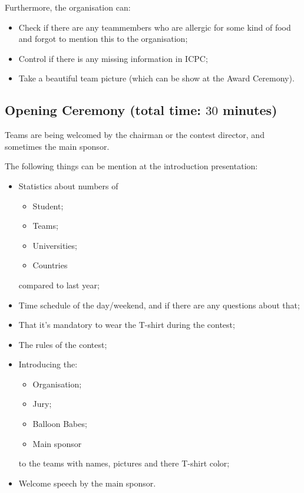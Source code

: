 Furthermore, the organisation can:
\begin{itemize}
\item Check if there are any teammembers who are allergic for some kind of food and forgot to mention this to the organisation;
\item Control if there is any missing information in ICPC;
\item Take a beautiful team picture (which can be show at the Award Ceremony).
\end{itemize}

\subsection{Opening Ceremony (total time: $30$ minutes)}\label{openingCeremony}
Teams are being welcomed by the chairman or the contest director, and sometimes the main sponsor.

The following things can be mention at the introduction presentation:
\begin{itemize}
\item Statistics about numbers of
	\begin{itemize}
	\item Student;
	\item Teams;
	\item Universities;
	\item Countries
	\end{itemize}
compared to last year;
\item Time schedule of the day/weekend, and if there are any questions about that;
\item That it's mandatory to wear the T-shirt during the contest;
\item The rules of the contest;
\item Introducing the:
	\begin{itemize}
	\item Organisation;
	\item Jury;
	\item Balloon Babes;
	\item Main sponsor
	\end{itemize}
to the teams with names, pictures and there T-shirt color;
\item Welcome speech by the main sponsor.
\end{itemize}

